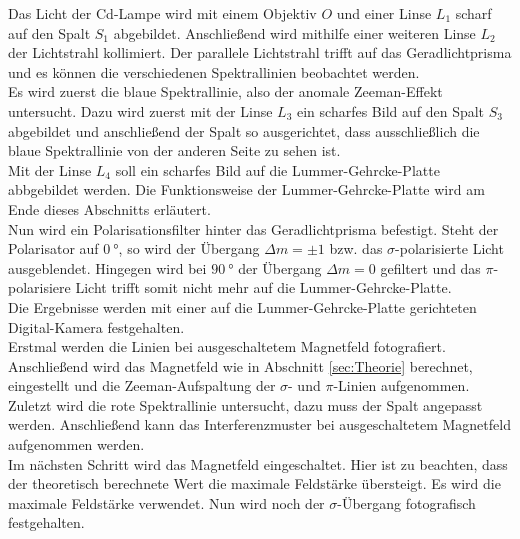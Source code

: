 Das Licht der Cd-Lampe wird mit einem Objektiv $O$ und einer Linse $L_1$ scharf auf den Spalt $S_1$ abgebildet.
Anschließend wird mithilfe einer weiteren Linse $L_2$ der Lichtstrahl kollimiert.
Der parallele Lichtstrahl trifft auf das Geradlichtprisma und es können die verschiedenen Spektrallinien beobachtet werden.
\\
Es wird zuerst die blaue Spektrallinie, also der anomale Zeeman-Effekt untersucht.
Dazu wird zuerst mit der Linse $L_3$ ein scharfes Bild auf den Spalt $S_3$ abgebildet und anschließend der Spalt so ausgerichtet, dass ausschließlich die blaue Spektrallinie von der anderen Seite zu sehen ist.
\\
Mit der Linse $L_4$ soll ein scharfes Bild auf die Lummer-Gehrcke-Platte abbgebildet werden.
Die Funktionsweise der Lummer-Gehrcke-Platte wird am Ende dieses Abschnitts erläutert.
\\
Nun wird ein Polarisationsfilter hinter das Geradlichtprisma befestigt.
Steht der Polarisator auf $\SI{0}{\degree}$, so wird der Übergang $\Delta m = \pm 1$ bzw. das $\sigma$-polarisierte Licht ausgeblendet.
Hingegen wird bei $\SI{90}{\degree}$ der Übergang $\Delta m = 0$ gefiltert und das $\pi$-polarisiere Licht trifft somit nicht mehr auf die Lummer-Gehrcke-Platte.
\\
Die Ergebnisse werden mit einer auf die Lummer-Gehrcke-Platte gerichteten Digital-Kamera festgehalten.
\\
Erstmal werden die Linien bei ausgeschaltetem Magnetfeld fotografiert.
Anschließend wird das Magnetfeld wie in Abschnitt \ref{sec:Theorie} berechnet, eingestellt und die Zeeman-Aufspaltung der $\sigma$- und $\pi$-Linien aufgenommen.
\\
Zuletzt wird die rote Spektrallinie untersucht, dazu muss der Spalt angepasst werden.
Anschließend kann das Interferenzmuster bei ausgeschaltetem Magnetfeld aufgenommen werden.
\\
Im nächsten Schritt wird das Magnetfeld eingeschaltet.
Hier ist zu beachten, dass der theoretisch berechnete Wert die maximale Feldstärke übersteigt.
Es wird die maximale Feldstärke verwendet.
Nun wird noch der $\sigma$-Übergang fotografisch festgehalten.